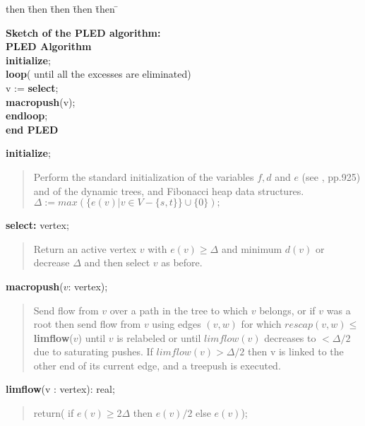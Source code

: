 \begin{tabbing}
then \= then \= then \= then \= then \= \kill

{\bf Sketch of the PLED algorithm:}\\[5mm]

{\bf PLED Algorithm}\\
\> {\bf initialize}; \\
\> {\bf loop}( until all the excesses are eliminated)\\
\> \> v := {\bf select}; \\
\> \> {\bf macropush}(v);\\
\> {\bf endloop};\\
{\bf end PLED}\\
\end{tabbing}
{\bf initialize};
\begin{quote} 
Perform the standard initialization of the variables $f, d$ and $e$
(see \cite{GT88}, pp.925) and of the dynamic trees, 
and Fibonacci heap data structures.\\  
$\Delta := max(\{e(v) | v \in V-\{s,t\}\} \cup \{0\});$ \\
\end{quote}
{\bf select:} vertex; 
\begin{quote} 
Return an active vertex $v$ with $e(v) \ge \Delta$ 
and minimum $d(v)$ or decrease $\Delta$ and then select $v$ as
before.\\
\end{quote}
{\bf macropush}($v$: vertex); 
\begin{quote} 
Send flow from $v$ over a path in the tree to which $v$ belongs,
or if $v$ was a root then send flow from $v$ using  
edges $(v,w)$ for which $ rescap(v,w) \le$ {\bf limflow}($v$) 
until $v$ is relabeled or until $limflow(v)$ decreases to 
$< \Delta /2$ due to saturating pushes. If  $limflow(v) > \Delta /2$
then v is linked to the other end of its current edge, and a treepush
is executed. \\
\end{quote}
{\bf limflow}(v : vertex): real;
\begin{quote} 
return( if $e(v) \ge 2\Delta$ then $e(v)/2$ else $e(v)$);\\
\end{quote}


